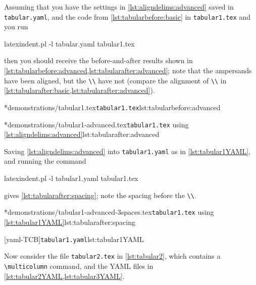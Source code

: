 	Assuming that you have the settings in \cref{lst:aligndelims:advanced} saved in \texttt{tabular.yaml}, and the code
	from \cref{lst:tabularbefore:basic} in \texttt{tabular1.tex} and you run
	\begin{commandshell}
latexindent.pl -l tabular.yaml tabular1.tex 
\end{commandshell}
	then you should receive the before-and-after results shown in
	\cref{lst:tabularbefore:advanced,lst:tabularafter:advanced}; note that the ampersands have been aligned, but
	the \lstinline!\\! have not (compare the alignment of \lstinline!\\! in \cref{lst:tabularafter:basic,lst:tabularafter:advanced}).

	\begin{minipage}{.45\textwidth}
		\cmhlistingsfromfile[showspaces=false,showtabs=false]*{demonstrations/tabular1.tex}{\texttt{tabular1.tex}}{lst:tabularbefore:advanced}
	\end{minipage}%
	\hfill
	\begin{minipage}{.45\textwidth}
		\cmhlistingsfromfile[showspaces=false,showtabs=false]*{demonstrations/tabular1-advanced.tex}{\texttt{tabular1.tex} using \cref{lst:aligndelims:advanced}}{lst:tabularafter:advanced}
	\end{minipage}%

	Saving \cref{lst:aligndelims:advanced} into \texttt{tabular1.yaml} as in \cref{lst:tabular1YAML}, and running the command
	\begin{commandshell}
latexindent.pl -l tabular1.yaml tabular1.tex 
\end{commandshell}
	gives \cref{lst:tabularafter:spacing}; note the spacing before the \lstinline!\\!.

	\begin{minipage}{.45\textwidth}
		\cmhlistingsfromfile[showspaces=false,showtabs=false]*{demonstrations/tabular1-advanced-3spaces.tex}{\texttt{tabular1.tex} using \cref{lst:tabular1YAML}}{lst:tabularafter:spacing}
	\end{minipage}%
	\hfill
	\begin{minipage}{.54\textwidth}
		[yaml-TCB]{\texttt{tabular1.yaml}}{lst:tabular1YAML}
	\end{minipage}%

	Now consider the file \texttt{tabular2.tex} in \cref{lst:tabular2}, which contains a \lstinline!\multicolumn! command, and
	the YAML files in \cref{lst:tabular2YAML,lst:tabular3YAML}.


